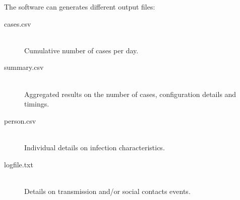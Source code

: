 The software can generates different output files:
\begin{description}
	\item [cases.csv] \ \\
	Cumulative number of cases per day.
	\item [summary.csv] \ \\
	Aggregated results on the number of cases, configuration details and timings.
	\item [person.csv] \ \\
	Individual details on infection characteristics.
	\item [logfile.txt] \ \\
	Details on transmission and/or social contacts events.
\end{description}	
	
	
	
